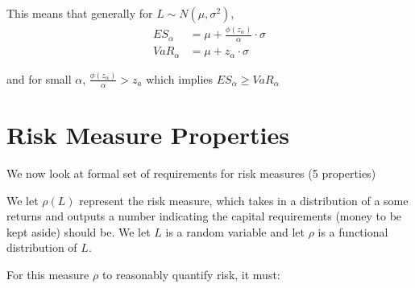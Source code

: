 \documentclass[
  oneside]{book}
\begin{document}
This means that generally for \(L\sim N(\mu, \sigma^{2})\),
\[
\begin{aligned}
ES_{\alpha} &= \mu + \frac{\phi(z_{\alpha})}{\alpha} \cdot \sigma\\
VaR_{\alpha} &= \mu +z_{\alpha}\cdot \sigma
\end{aligned}
\]

and for small \(\alpha\), \(\frac{\phi(z_{\alpha})}{\alpha} > z_{a}\) which implies \(ES_{\alpha}\geq VaR_{\alpha}\)

\hypertarget{risk-measure-properties}{%
\section{Risk Measure Properties}\label{risk-measure-properties}}

We now look at formal set of requirements for risk measures (5 properties)

We let \(\rho(L)\) represent the risk measure, which takes in a distribution of a some returns and outputs a number indicating the capital requirements (money to be kept aside) should be.
We let \(L\) is a random variable and let \(\rho\) is a functional distribution of \(L\).

For this measure \(\rho\) to reasonably quantify risk, it must:
\end{document}
